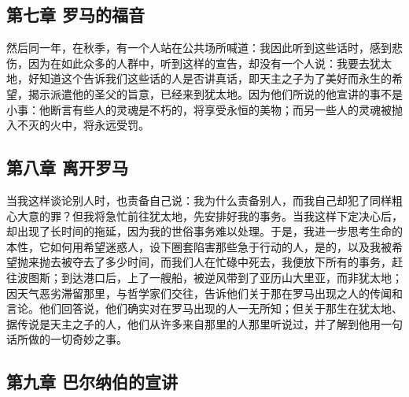 
\subsection{第七章 罗马的福音}

然后同一年，在秋季，有一个人站在公共场所喊道：我因此听到这些话时，感到悲伤，因为在如此众多的人群中，听到这样的宣告，却没有一个人说：我要去犹太地，好知道这个告诉我们这些话的人是否讲真话，即天主之子为了美好而永生的希望，揭示派遣他的圣父的旨意，已经来到犹太地。因为他们所说的他宣讲的事不是小事：他断言有些人的灵魂是不朽的，将享受永恒的美物；而另一些人的灵魂被抛入不灭的火中，将永远受罚。\par


\subsection{第八章 离开罗马}

当我这样谈论别人时，也责备自己说：我为什么责备别人，而我自己却犯了同样粗心大意的罪？但我将急忙前往犹太地，先安排好我的事务。当我这样下定决心后，却出现了长时间的拖延，因为我的世俗事务难以处理。于是，我进一步思考生命的本性，它如何用希望迷惑人，设下圈套陷害那些急于行动的人，是的，以及我被希望抛来抛去被夺去了多少时间，而我们人在忙碌中死去，我便放下所有的事务，赶往波图斯；到达港口后，上了一艘船，被逆风带到了亚历山大里亚，而非犹太地；因天气恶劣滞留那里，与哲学家们交往，告诉他们关于那在罗马出现之人的传闻和言论。他们回答说，他们确实对在罗马出现的人一无所知；但关于那生在犹太地、据传说是天主之子的人，他们从许多来自那里的人那里听说过，并了解到他用一句话所做的一切奇妙之事。\par


\subsection{第九章 巴尔纳伯的宣讲}

